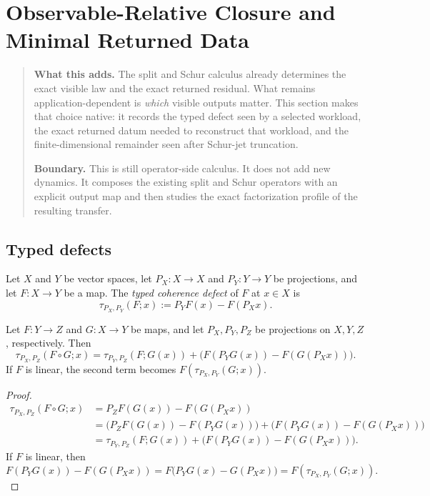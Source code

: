 \section{Observable-Relative Closure and Minimal Returned Data}
\label{sec:observable-relative-closure}

\begin{quote}\small
\textbf{What this adds.}
The split and Schur calculus already determines the exact visible law and the
exact returned residual. What remains application-dependent is \emph{which}
visible outputs matter. This section makes that choice native: it records the
typed defect seen by a selected workload, the exact returned datum needed to
reconstruct that workload, and the finite-dimensional remainder seen after
Schur-jet truncation.

\smallskip\noindent
\textbf{Boundary.}
This is still operator-side calculus. It does not add new dynamics. It
composes the existing split and Schur operators with an explicit output map and
then studies the exact factorization profile of the resulting transfer.
\end{quote}

\subsection{Typed defects}

\begin{definition}
\label{def:typed-coherence-defect}
Let \(X\) and \(Y\) be vector spaces, let \(P_X:X\to X\) and \(P_Y:Y\to Y\) be
projections, and let \(F:X\to Y\) be a map. The \emph{typed coherence defect}
of \(F\) at \(x\in X\) is
\[
\tau_{P_X,P_Y}(F;x):=P_YF(x)-F(P_Xx).
\]
\end{definition}

\begin{proposition}
\label{prop:typed-chain-rule}
Let \(F:Y\to Z\) and \(G:X\to Y\) be maps, and let \(P_X,P_Y,P_Z\) be
projections on \(X,Y,Z\), respectively. Then
\[
\tau_{P_X,P_Z}(F\circ G;x)
=
\tau_{P_Y,P_Z}(F;G(x))
+
\bigl(F(P_YG(x))-F(G(P_Xx))\bigr).
\]
If \(F\) is linear, the second term becomes \(F(\tau_{P_X,P_Y}(G;x))\).
\end{proposition}

\begin{proof}
\begin{align*}
\tau_{P_X,P_Z}(F\circ G;x)
&=
P_ZF(G(x))-F(G(P_Xx)) \\
&=
\bigl(P_ZF(G(x))-F(P_YG(x))\bigr)
+
\bigl(F(P_YG(x))-F(G(P_Xx))\bigr) \\
&=
\tau_{P_Y,P_Z}(F;G(x))
+
\bigl(F(P_YG(x))-F(G(P_Xx))\bigr).
\end{align*}
If \(F\) is linear, then
\[
F(P_YG(x))-F(G(P_Xx))
=
F\bigl(P_YG(x)-G(P_Xx)\bigr)
=
F(\tau_{P_X,P_Y}(G;x)).
\]
\end{proof}

